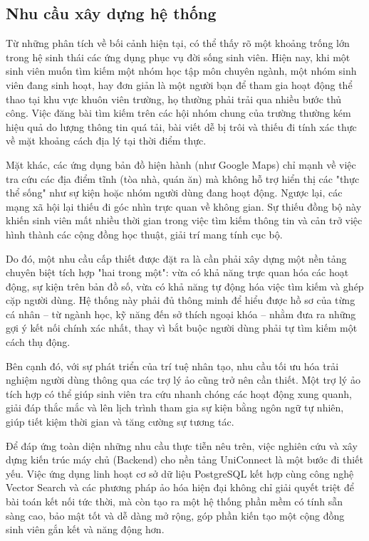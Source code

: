 \subsection{Nhu cầu xây dựng hệ thống}

Từ những phân tích về bối cảnh hiện tại, có thể thấy rõ một khoảng trống lớn trong hệ sinh thái các ứng dụng phục vụ đời sống sinh viên. Hiện nay, khi một sinh viên muốn tìm kiếm một nhóm học tập môn chuyên ngành, một nhóm sinh viên đang sinh hoạt, hay đơn giản là một người bạn để tham gia hoạt động thể thao tại khu vực khuôn viên trường, họ thường phải trải qua nhiều bước thủ công. Việc đăng bài tìm kiếm trên các hội nhóm chung của trường thường kém hiệu quả do lượng thông tin quá tải, bài viết dễ bị trôi và thiếu đi tính xác thực về mặt khoảng cách địa lý tại thời điểm thực.

Mặt khác, các ứng dụng bản đồ hiện hành (như Google Maps) chỉ mạnh về việc tra cứu các địa điểm tĩnh (tòa nhà, quán ăn) mà không hỗ trợ hiển thị các "thực thể sống" như sự kiện hoặc nhóm người dùng đang hoạt động. Ngược lại, các mạng xã hội lại thiếu đi góc nhìn trực quan về không gian. Sự thiếu đồng bộ này khiến sinh viên mất nhiều thời gian trong việc tìm kiếm thông tin và cản trở việc hình thành các cộng đồng học thuật, giải trí mang tính cục bộ\cite{scellato2011socio}.

Do đó, một nhu cầu cấp thiết được đặt ra là cần phải xây dựng một nền tảng chuyên biệt tích hợp "hai trong một": vừa có khả năng trực quan hóa các hoạt động, sự kiện trên bản đồ số, vừa có khả năng tự động hóa việc tìm kiếm và ghép cặp người dùng. Hệ thống này phải đủ thông minh để hiểu được hồ sơ của từng cá nhân – từ ngành học, kỹ năng đến sở thích ngoại khóa – nhằm đưa ra những gợi ý kết nối chính xác nhất, thay vì bắt buộc người dùng phải tự tìm kiếm một cách thụ động\cite{pazzani2007content}.

Bên cạnh đó, với sự phát triển của trí tuệ nhân tạo, nhu cầu tối ưu hóa trải nghiệm người dùng thông qua các trợ lý ảo cũng trở nên cần thiết. Một trợ lý ảo tích hợp có thể giúp sinh viên tra cứu nhanh chóng các hoạt động xung quanh, giải đáp thắc mắc và lên lịch trình tham gia sự kiện bằng ngôn ngữ tự nhiên, giúp tiết kiệm thời gian và tăng cường sự tương tác\cite{adamopoulou2020overview}.

Để đáp ứng toàn diện những nhu cầu thực tiễn nêu trên, việc nghiên cứu và xây dựng kiến trúc máy chủ (Backend) cho nền tảng UniConnect là một bước đi thiết yếu. Việc ứng dụng linh hoạt cơ sở dữ liệu PostgreSQL kết hợp cùng công nghệ Vector Search và các phương pháp ảo hóa hiện đại không chỉ giải quyết triệt để bài toán kết nối tức thời, mà còn tạo ra một hệ thống phần mềm có tính sẵn sàng cao, bảo mật tốt và dễ dàng mở rộng, góp phần kiến tạo một cộng đồng sinh viên gắn kết và năng động hơn.

